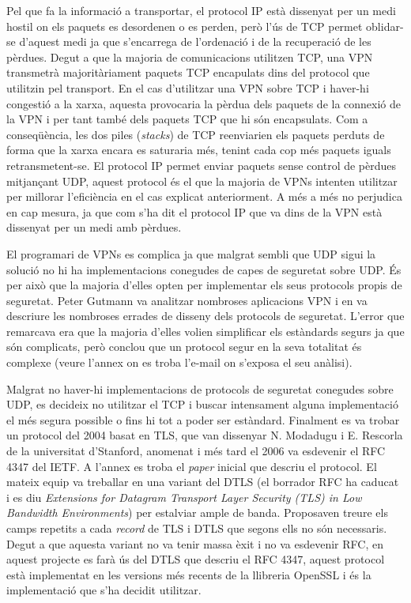 Pel que fa la informació a transportar, el protocol IP està dissenyat per un medi hostil on els paquets es desordenen o es perden, però l'ús de TCP permet oblidar-se d'aquest medi ja que s'encarrega de l'ordenació i de la recuperació de les pèrdues. Degut a que la majoria de comunicacions utilitzen TCP, una VPN transmetrà majoritàriament paquets TCP encapulats dins del protocol que utilitzin pel transport.
En el cas d'utilitzar una VPN sobre TCP i haver-hi congestió a la xarxa, aquesta provocaria la pèrdua dels paquets de la connexió de la VPN i per tant també dels paquets TCP que hi són encapsulats. Com a conseqüència, les dos piles (\emph{stacks}) de TCP reenviarien els paquets perduts de forma que la xarxa encara es saturaria més, tenint cada cop més paquets iguals retransmetent-se.
El protocol IP permet enviar paquets sense control de pèrdues mitjançant UDP, aquest protocol és el que la majoria de VPNs intenten utilitzar per millorar l'eficiència en el cas explicat anteriorment. A més a més no  perjudica en cap mesura, ja que com s'ha dit el protocol IP que va dins de la VPN està dissenyat per un medi amb pèrdues.

El programari de VPNs es complica ja que malgrat sembli que UDP sigui la solució no hi ha implementacions conegudes de capes de seguretat sobre UDP. És per això que la majoria d'elles opten per implementar els seus protocols propis de seguretat.
Peter Gutmann va analitzar nombroses aplicacions VPN i en va descriure les nombroses errades de disseny dels protocols de seguretat. L'error que remarcava era que la majoria d'elles volien simplificar els estàndards segurs ja que són complicats, però conclou que un protocol segur en la seva totalitat és complexe (veure l'annex  on es troba l'e-mail on s'exposa el seu anàlisi).

Malgrat no haver-hi implementacions de protocols de seguretat conegudes sobre UDP, es decideix no utilitzar el TCP i buscar intensament alguna implementació el més segura possible o fins hi tot a poder ser estàndard. Finalment es va trobar un protocol del 2004 basat en TLS, que van dissenyar N. Modadugu i E. Rescorla de la universitat d'Stanford, anomenat  i més tard el 2006 va esdevenir el RFC 4347 del IETF. A l'annex  es troba el \emph{paper} inicial que descriu el protocol. El mateix equip va treballar en una variant del DTLS (el borrador RFC ha caducat i es diu \emph{Extensions for Datagram Transport Layer Security (TLS) in Low Bandwidth Environments}) per estalviar ample de banda. Proposaven treure els camps repetits a cada \emph{record} de TLS i DTLS que segons ells no són necessaris. Degut a que aquesta variant no va tenir massa èxit i no va esdevenir RFC, en aquest projecte es farà ús del DTLS que descriu el RFC 4347, aquest protocol està implementat en les versions més recents de la llibreria OpenSSL i és la implementació que s'ha decidit utilitzar.

